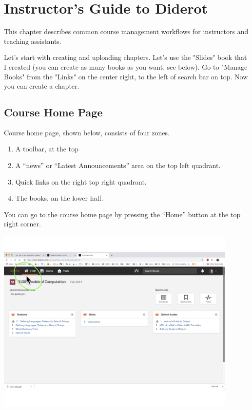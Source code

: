 \chapter{Instructor's Guide to Diderot}
\label{ch:guide}

\begin{preamble}
This chapter describes common course management workflows for instructors and teaching assistants.
\end{preamble}

%

Let's start with creating and uploading chapters.  Let's use the
"Slides" book that I created (you can create as many books as you
want, see below).  Go to "Manage Books" from the "Links" on the center
right, to the left of search bar on top.  Now you can create a
chapter.  

\section{Course Home Page}

\begin{gram}
Course home page, shown below, consists of four zones.
\begin{enumerate}
\item A toolbar, at the top
\item A ``news'' or ``Latest Announcements'' area on the top left quadrant.
\item Quick links on the right top right quadrant.
\item The books, an the lower half.
\end{enumerate}

You can go to the course home page by pressing the ``Home'' button at the top right corner.

\includegraphics[width=0.9\textwidth]{author/media/course-home.jpg}
\end{gram}

